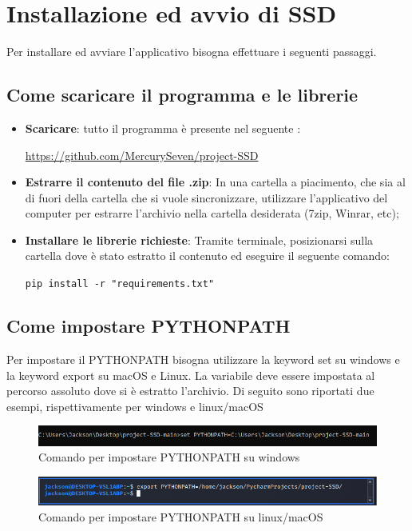 \section{Installazione ed avvio di SSD}
Per installare ed avviare l'applicativo  bisogna effettuare i seguenti passaggi.
\subsection{Come scaricare il programma e le librerie}

\begin{itemize}
	\item \textbf{Scaricare}: tutto il programma è presente nel seguente :\newline{}
\centerline{\url{https://github.com/MercurySeven/project-SSD}}

	\item \textbf{Estrarre il contenuto del file .zip}: In una cartella a piacimento, che sia al di fuori della cartella che si vuole sincronizzare, utilizzare l'applicativo del computer per estrarre l'archivio nella cartella desiderata (7zip, Winrar, etc);
	\item \textbf{Installare le librerie richieste}:
	Tramite terminale, posizionarsi sulla cartella dove è stato estratto il contenuto ed eseguire il seguente comando:\newline{}
	\centerline{\texttt{pip install -r "requirements.txt"}}
\end{itemize}
\subsection{Come impostare PYTHONPATH}
Per impostare il PYTHONPATH bisogna utilizzare la keyword set su windows e la keyword export su macOS e Linux. La variabile deve essere impostata al percorso assoluto dove si è estratto l'archivio.
Di seguito sono riportati due esempi, rispettivamente per windows e linux/macOS
\begin{figure}[H]
    \centering
    \includegraphics[scale = 0.65]{components/img/Windows-istruzione-1.png}
    \caption{Comando per impostare PYTHONPATH su windows}
    \label{fig:comando per impostare PYTHONPATH su windows}
\end{figure}
\begin{figure}[H]
    \centering
    \includegraphics[scale = 0.50]{components/img/linux-istruzione-1.jpg}
    \caption{ Comando per impostare PYTHONPATH su linux/macOS}
    \label{fig:comando per impostare PYTHONPATH su windows}
\end{figure}
